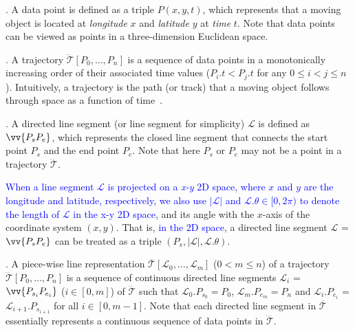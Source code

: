 . A data point is defined as a triple $P(x, y, t)$, which represents that a moving object is located at {\em longitude} $x$ and {\em latitude} $y$ at {\em time} $t$. Note that data points can be viewed as points in a three-dimension Euclidean space.

. A trajectory $\dddot{\mathcal{T}}[P_0, \ldots, P_n]$ is a sequence of data points in a monotonically increasing order of their associated time values (\ie $P_i.t < P_j.t$ for any $0\le i<j\le n$). Intuitively, a trajectory is the path (or track) that a moving object follows through space as a function of time~\cite{physics-trajectory}.


. A directed line segment (or line segment for simplicity) $\mathcal{L}$ is defined as $\vv{P_{s}P_{e}}$, which represents the closed line segment that connects the start point $P_s$ and the end point $P_e$.
Note that here $P_s$ or $P_e$ may not be a point in a trajectory $\dddot{\mathcal{T}}$.


\textcolor{blue}{When a line segment $\mathcal{L}$ is projected on a \emph{x-y} 2D space, where $x$ and $y$ are the longitude and latitude, respectively, we also use $|\mathcal{L}|$ and $\mathcal{L}.\theta\in [0, 2\pi)$ to denote the length of $\mathcal{L}$ in the x-y 2D space}, and its angle with the $x$-axis of the coordinate system $(x, y)$.
That is, \textcolor{blue}{in the 2D space}, a directed line segment $\mathcal{L}$ = $\vv{P_{s}P_{e}}$ can be treated as a triple $(P_s, |\mathcal{L}|, \mathcal{L}.\theta)$.

. A piece-wise line representation $\overline{\mathcal{T}}[\mathcal{L}_0, \ldots , \mathcal{L}_m]$ ($0< m \le n$) of a trajectory $\dddot{\mathcal{T}}[P_0, \ldots, P_n]$ is a sequence of continuous directed line segments $\mathcal{L}_{i}$ = $\vv{P_{s_i}P_{e_i}}$ ($i\in[0,m]$) of $\dddot{\mathcal{T}}$  such that $\mathcal{L}_{0}.P_{s_0} = P_0$, $\mathcal{L}_{m}.P_{e_m} = P_n$ and  $\mathcal{L}_{i}.P_{e_i}$ = $\mathcal{L}_{i+1}.P_{s_{i+1}}$ for all $i\in[0, m-1]$. Note that each directed line segment in $\overline{\mathcal{T}}$ essentially represents a continuous sequence of data points in $\dddot{\mathcal{T}}$.

